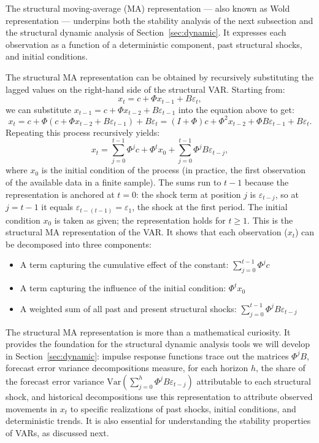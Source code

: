 \documentclass[12pt]{article}
\begin{document}
The structural moving-average (MA) representation --- also known as Wold representation --- underpins both the stability analysis of the next subsection and the structural dynamic analysis of Section~\ref{sec:dynamic}. It expresses each observation as a function of a deterministic component, past structural shocks, and initial conditions.

The structural MA representation can be obtained by recursively substituting the lagged values on the right-hand side of the structural VAR. Starting from:
\begin{equation}
	x_{t}= c + \Phi x_{t-1}+B\varepsilon_{t},
\end{equation}%
we can substitute $x_{t-1}= c + \Phi x_{t-2}+B\varepsilon_{t-1}$ into the equation above to get:
\begin{equation}
	x_{t}= c + \Phi(c + \Phi x_{t-2}+B\varepsilon_{t-1})+B\varepsilon_{t}= (I + \Phi)c + \Phi^{2}x_{t-2}+\Phi B\varepsilon_{t-1}+B\varepsilon_{t}.
\end{equation}%
Repeating this process recursively yields:
\begin{equation}\label{eq:wold}
	x_{t}=\sum_{j=0}^{t-1}\Phi^{j}c + \Phi^{t}x_{0}+\sum_{j=0}^{t-1}\Phi^{j}B\varepsilon_{t-j},
\end{equation}%
where $x_{0}$ is the initial condition of the process (in practice, the first observation of the available data in a finite sample). The sums run to $t-1$ because the representation is anchored at $t=0$: the shock term at position $j$ is $\varepsilon_{t-j}$, so at $j=t-1$ it equals $\varepsilon_{t-(t-1)}=\varepsilon_{1}$, the shock at the first period. The initial condition $x_0$ is taken as given; the representation holds for $t \geq 1$. This is the structural MA representation of the VAR. It shows that each observation ($x_{t}$) can be decomposed into three components:
\begin{itemize}
	\item A term capturing the cumulative effect of the constant: $\sum_{j=0}^{t-1}\Phi^{j}c$
	\item A term capturing the influence of the initial condition: $\Phi^{t}x_{0}$
	\item A weighted sum of all past and present structural shocks: $\sum_{j=0}^{t-1}\Phi^{j}B\varepsilon_{t-j}$
\end{itemize}
The structural MA representation is more than a mathematical curiosity. It provides the foundation for the structural dynamic analysis tools we will develop in Section~\ref{sec:dynamic}: impulse response functions trace out the matrices $\Phi^{j}B$, forecast error variance decompositions measure, for each horizon $h$, the share of the forecast error variance $\text{Var}\!\left(\sum_{j=0}^{h}\Phi^{j}B\varepsilon_{t-j}\right)$ attributable to each structural shock, and historical decompositions use this representation to attribute observed movements in $x_t$ to specific realizations of past shocks, initial conditions, and deterministic trends. It is also essential for understanding the stability properties of VARs, as discussed next.
\end{document}
